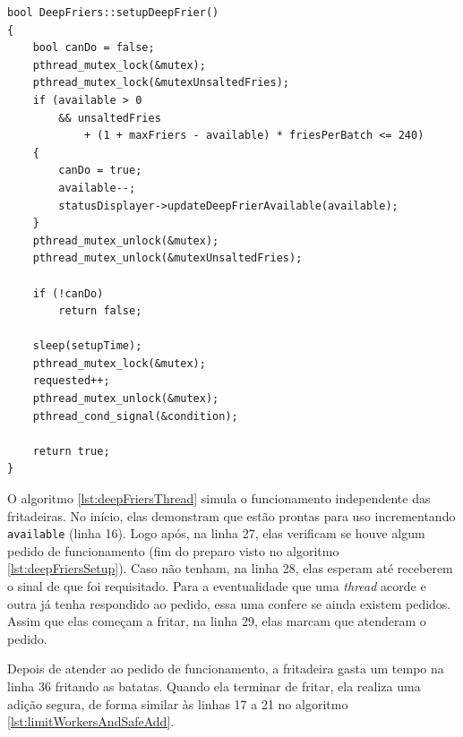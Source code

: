 \documentclass[a4paper]{article}
\begin{document}
\begin{lstlisting}[caption=Preparação das fritadeiras.\label{lst:deepFriersSetup}]
bool DeepFriers::setupDeepFrier()
{
	bool canDo = false;
	pthread_mutex_lock(&mutex);
	pthread_mutex_lock(&mutexUnsaltedFries);
	if (available > 0 
		&& unsaltedFries 
			+ (1 + maxFriers - available) * friesPerBatch <= 240)
	{
		canDo = true;
		available--;
		statusDisplayer->updateDeepFrierAvailable(available);
	}
	pthread_mutex_unlock(&mutex);
	pthread_mutex_unlock(&mutexUnsaltedFries);
	
	if (!canDo)
		return false;
	
	sleep(setupTime);
	pthread_mutex_lock(&mutex);
	requested++;
	pthread_mutex_unlock(&mutex);
	pthread_cond_signal(&condition);
	
	return true;
}
\end{lstlisting}

O algoritmo \ref{lst:deepFriersThread} simula o funcionamento independente das fritadeiras. No início, elas demonstram que estão prontas para uso incrementando \texttt{available} (linha 16). Logo após, na linha 27, elas verificam se houve algum pedido de funcionamento (fim do preparo visto no algoritmo \ref{lst:deepFriersSetup}). Caso não tenham, na linha 28, elas esperam até receberem o sinal de que foi requisitado. Para a eventualidade que uma \textit{thread} acorde e outra já tenha respondido ao pedido, essa uma confere se ainda existem pedidos. Assim que elas começam a fritar, na linha 29, elas marcam que atenderam o pedido.

Depois de atender ao pedido de funcionamento, a fritadeira gasta um tempo na linha 36 fritando as batatas. Quando ela terminar de fritar, ela realiza uma adição segura, de forma similar às linhas 17 a 21  no algoritmo \ref{lst:limitWorkersAndSafeAdd}.
\end{document}
